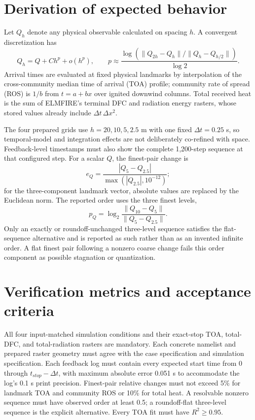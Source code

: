 \section{Derivation of expected behavior}
Let $Q_h$ denote any physical observable calculated on spacing $h$.  A convergent discretization has
\begin{equation}
 Q_h=Q+C h^p+o(h^p),
 \qquad
 p\approx\frac{\log\left(\lVert Q_{2h}-Q_h\rVert/\lVert Q_h-Q_{h/2}\rVert\right)}{\log 2}.
\end{equation}
Arrival times are evaluated at fixed physical landmarks by interpolation of the cross-community median time of arrival (TOA) profile; community rate of spread (ROS) is $1/b$ from $t=a+bx$ over ignited downwind columns.  Total received heat is the sum of ELMFIRE's terminal DFC and radiation energy rasters, whose stored values already include $\Delta t\,\Delta x^2$.

The four prepared grids use $h=20,10,5,2.5$ m with one fixed $\Delta t=0.25$ s, so temporal-model and integration effects are not deliberately co-refined with space.  Feedback-level timestamps must also show the complete 1,200-step sequence at that configured step.  For a scalar $Q$, the finest-pair change is
\[
 e_Q=\frac{|Q_{5}-Q_{2.5}|}{\max(|Q_{2.5}|,10^{-12})};
\]
for the three-component landmark vector, absolute values are replaced by the Euclidean norm.  The reported order uses the three finest levels,
\[
 p_Q=\log_2\frac{\lVert Q_{10}-Q_5\rVert}{\lVert Q_5-Q_{2.5}\rVert}.
\]
Only an exactly or roundoff-unchanged three-level sequence satisfies the flat-sequence alternative and is reported as such rather than as an invented infinite order.  A flat finest pair following a nonzero coarse change fails this order component as possible stagnation or quantization.

\section{Verification metrics and acceptance criteria}
All four input-matched simulation conditions and their exact-stop TOA, total-DFC, and total-radiation rasters are mandatory.  Each concrete namelist and prepared raster geometry must agree with the case specification and simulation specification.  Each feedback log must contain every expected start time from 0 through $t_{stop}-\Delta t$, with maximum absolute error 0.051 s to accommodate the log's 0.1 s print precision.  Finest-pair relative changes must not exceed 5\% for landmark TOA and community ROS or 10\% for total heat.  A resolvable nonzero sequence must have observed order at least 0.5; a roundoff-flat three-level sequence is the explicit alternative.  Every TOA fit must have $R^2\geq0.95$.

